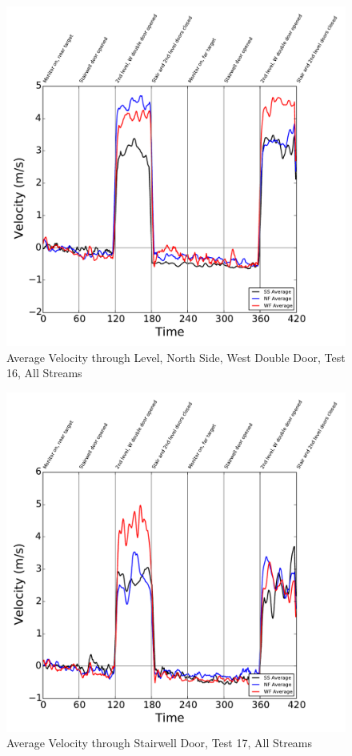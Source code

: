 \documentclass[12pt,oneside]{book}
\begin{document}
\begin{figure}[!ht]
\includegraphics[width=6in]{../../../Figures/Hose_Test_Figures/Test_16_West_063014_custom_BDP_A13_Avg}
\caption{Average Velocity through  Level, North Side, West Double Door, Test 16, All Streams}
\label{fig:Test_16_BDP_A13_Avg_All}
\end{figure}

\clearpage

\begin{figure}[!ht]
\includegraphics[width=6in]{../../../Figures/Hose_Test_Figures/Test_17_West_063014_BDP_A13_Avg}
\caption{Average Velocity through Stairwell Door, Test 17, All Streams}
\label{fig:Test_17_BDP_A10_Avg_All}
\end{figure}
\end{document}
